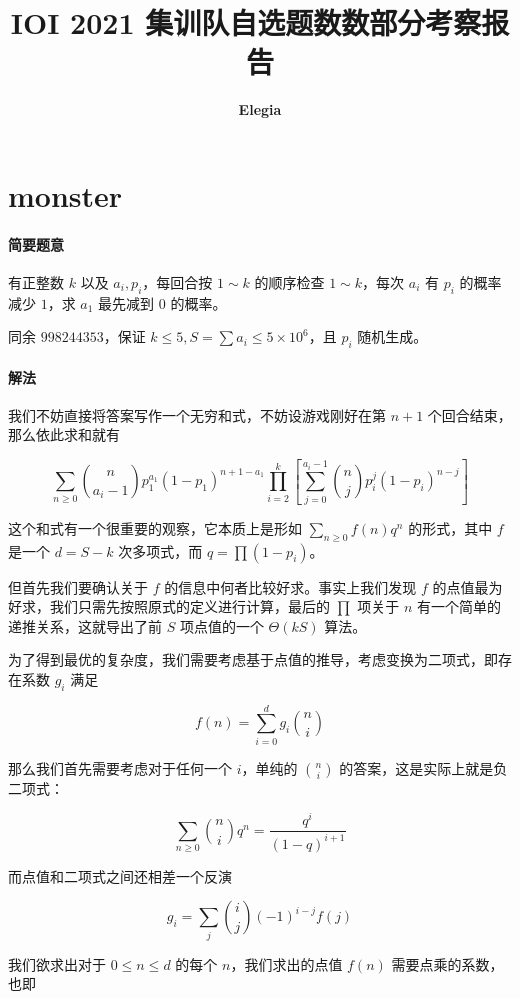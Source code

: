 \documentclass[12pt]{ctexart}
\title{\textbf{IOI 2021 集训队自选题数数部分考察报告}}
\author{\textbf{Elegia}}
\date{}
\theoremstyle{theorem}
\theoremstyle{theorem}
\begin{document}
\maketitle

\tableofcontents

\newpage

\section{monster}

\paragraph{简要题意} 有正整数 $k$ 以及 $a_i, p_i$，每回合按 $1\sim k$ 的顺序检查 $1\sim k$，每次 $a_i$ 有 $p_i$ 的概率减少 $1$，求 $a_1$ 最先减到 $0$ 的概率。

同余 $998244353$，保证 $k\le 5, S=\sum a_i \le 5\times 10^6$，且 $p_i$ 随机生成。

\paragraph{解法}

我们不妨直接将答案写作一个无穷和式，不妨设游戏刚好在第 $n+1$ 个回合结束，那么依此求和就有

$$
\sum_{n\ge 0} \binom n{a_i-1} p_1^{a_1} (1-p_1)^{n+1-a_1} \prod_{i=2}^k
\left[\sum_{j=0}^{a_i-1} \binom n j p_i^j(1-p_i)^{n-j}\right]
$$

这个和式有一个很重要的观察，它本质上是形如 $\sum_{n\ge 0} f(n) q^n$ 的形式，其中 $f$ 是一个 $d=S - k$ 次多项式，而 $q = \prod (1-p_i)$。

但首先我们要确认关于 $f$ 的信息中何者比较好求。事实上我们发现 $f$ 的点值最为好求，我们只需先按照原式的定义进行计算，最后的 $\prod$ 项关于 $n$ 有一个简单的递推关系，这就导出了前 $S$ 项点值的一个 $\Theta(kS)$ 算法。

为了得到最优的复杂度，我们需要考虑基于点值的推导，考虑变换为二项式，即存在系数 $g_i$ 满足

$$
f(n) = \sum_{i=0}^{d} g_i \binom n i
$$

那么我们首先需要考虑对于任何一个 $i$，单纯的 $\binom n i$ 的答案，这是实际上就是负二项式：

$$
\sum_{n\ge 0} \binom n i q^n = \frac{q^i}{(1-q)^{i+1}}
$$

而点值和二项式之间还相差一个反演

$$
g_i = \sum_j \binom i j (-1)^{i-j} f(j)
$$

我们欲求出对于 $0\le n\le d$ 的每个 $n$，我们求出的点值 $f(n)$ 需要点乘的系数，也即
\end{document}
